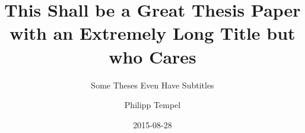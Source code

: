 \title{This Shall be a Great Thesis Paper with an Extremely Long Title but who Cares}
\subtitle{Some Theses Even Have Subtitles}
\author{Philipp Tempel}
\date{2015-08-28}

\usepackage{lipsum}
